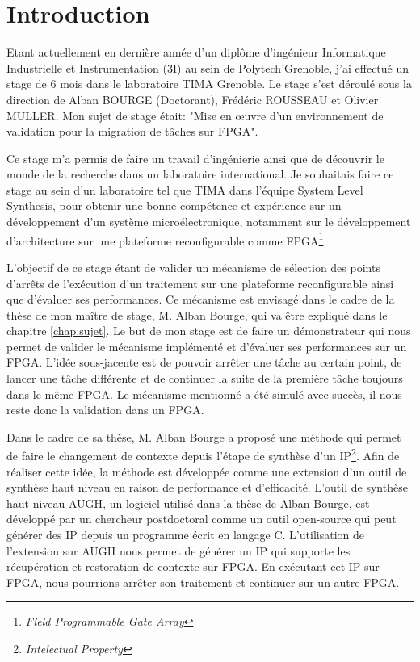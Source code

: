 \chapter{Introduction}
\OnehalfSpacing
\setlength{\parindent}{2em}
Etant actuellement en dernière année d'un diplôme d'ingénieur Informatique Industrielle et Instrumentation (3I) au sein de Polytech'Grenoble, j'ai effectué un stage de 6 mois dans le laboratoire TIMA Grenoble. Le stage s'est déroulé sous la direction de Alban BOURGE (Doctorant), Frédéric ROUSSEAU et Olivier MULLER. Mon sujet de stage était: "Mise en œuvre d'un environnement de validation pour la migration de tâches sur FPGA".

Ce stage m'a permis de faire un travail d'ingénierie ainsi que de découvrir le monde de la recherche
dans un laboratoire international. Je souhaitais faire ce stage au sein d'un laboratoire tel que TIMA dans l'équipe System Level Synthesis, pour obtenir une bonne compétence et expérience sur un développement d'un système microélectronique, notamment sur le développement d'architecture sur une plateforme reconfigurable comme FPGA\footnote{\emph{Field Programmable Gate Array}}. 

L'objectif de ce stage étant de valider un mécanisme de sélection des points d'arrêts de l'exécution d'un traitement sur une plateforme reconfigurable ainsi que d'évaluer ses performances. 
Ce mécanisme est envisagé dans le cadre de la thèse de mon maître de stage, M. Alban Bourge, qui va être expliqué dans le chapitre \ref{chap:sujet}. 
Le but de mon stage est de faire un démonstrateur qui nous permet de valider le mécanisme implémenté et d'évaluer ses performances sur un FPGA.
L'idée sous-jacente est de pouvoir arrêter une tâche au certain point, de lancer une tâche différente et de continuer la suite de la première tâche toujours dans le même FPGA. 
Le mécanisme mentionné a été simulé avec succès, il nous reste donc la validation dans un FPGA. 

Dans le cadre de sa thèse, M. Alban Bourge a proposé une méthode qui permet de faire le changement de contexte depuis l'étape de synthèse d'un IP\footnote{\emph{Intelectual Property}}. 
Afin de réaliser cette idée, la méthode est développée comme une extension d'un outil de synthèse haut niveau en raison de performance et d'efficacité. 
L'outil de synthèse haut niveau AUGH\cite{Prost2014}, un logiciel utilisé dans la thèse de Alban Bourge, est développé par un chercheur postdoctoral comme un outil open-source qui peut générer des IP depuis un programme écrit en langage C. L'utilisation de l'extension sur AUGH nous permet de générer un IP qui supporte les récupération et restoration de contexte sur FPGA. 
En exécutant cet IP sur FPGA, nous pourrions arrêter son traitement et continuer sur un autre FPGA. 

